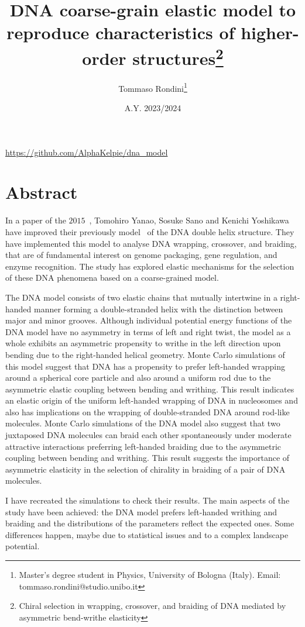 \documentclass[a4paper,10pt]{article}
\title{DNA coarse-grain elastic model to reproduce characteristics of higher-order structures\thanks{Chiral selection in wrapping, crossover, and braiding of DNA mediated by asymmetric bend-writhe elasticity\cite{main}}}
\author{Tommaso Rondini\thanks{Master's degree student in Physics, University of Bologna (Italy). Email: tommaso.rondini@studio.unibo.it}}
\date{A.Y. 2023/2024}
\begin{document}
\maketitle
\begin{center}
\url{https://github.com/AlphaKelpie/dna_model}
\end{center}

\section*{Abstract}
In a paper of the $2015$~\cite{main}, Tomohiro Yanao, Sosuke Sano and Kenichi Yoshikawa have improved their previously model~\cite{old, very_old} of the DNA double helix structure.
They have implemented this model to analyse DNA wrapping, crossover, and braiding, that are of fundamental interest on genome packaging, gene regulation, and enzyme recognition.
The study has explored elastic mechanisms for the selection of these DNA phenomena based on a coarse-grained model.

The DNA model consists of two elastic chains that mutually intertwine in a right-handed manner forming a double-stranded helix with the distinction between major and minor grooves.
Although individual potential energy functions of the DNA model have no asymmetry in terms of left and right twist, the model as a whole exhibits an asymmetric propensity to writhe in the left direction upon bending due to the right-handed helical geometry.
Monte Carlo simulations of this model suggest that DNA has a propensity to prefer left-handed wrapping around a spherical core particle and also around a uniform rod due to the asymmetric elastic coupling between bending and writhing.
This result indicates an elastic origin of the uniform left-handed wrapping of DNA in nucleosomes and also has implications on the wrapping of double-stranded DNA around rod-like molecules.
Monte Carlo simulations of the DNA model also suggest that two juxtaposed DNA molecules can braid each other spontaneously under moderate attractive interactions preferring left-handed braiding due to the asymmetric coupling between bending and writhing.
This result suggests the importance of asymmetric elasticity in the selection of chirality in braiding of a pair of DNA molecules.

I have recreated the simulations to check their results.
The main aspects of the study have been achieved: the DNA model prefers left-handed writhing and braiding and the distributions of the parameters reflect the expected ones.
Some differences happen, maybe due to statistical issues and to a complex landscape potential.
\end{document}
